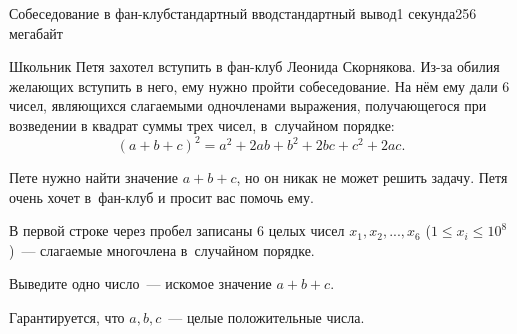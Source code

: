 \begin{problem}{Собеседование в фан-клуб}{стандартный ввод}{стандартный вывод}{1 секунда}{256 мегабайт}

Школьник Петя захотел вступить в фан-клуб Леонида Скорнякова. Из-за обилия желающих вступить в него, ему нужно пройти собеседование. На нём ему дали 6 чисел, являющихся слагаемыми одночленами выражения, получающегося при возведении в квадрат суммы трех чисел, в~случайном порядке:
$$(a + b + c)^2 = a^2 + 2 a b + b^2 + 2 b c + c^2 + 2 a c.$$

Пете нужно найти значение $a+b+c$, но он никак не может решить задачу. Петя очень хочет в~фан-клуб и просит вас помочь ему.

\InputFile
В первой строке через пробел записаны 6 целых чисел $x_1, x_2, ..., x_6$ ($1 \leq x_i \leq 10^8$)~--- слагаемые многочлена в~случайном порядке.

\OutputFile
Выведите одно число~--- искомое значение $a + b + c$.

\Example

\begin{example}
%
\end{example}

\Note
Гарантируется, что $a, b, c$~--- целые положительные числа.

\end{problem}

